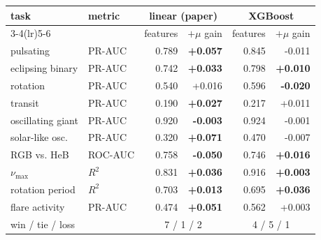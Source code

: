 \begin{tabular}{llrrrr}
\toprule
task & metric & \multicolumn{2}{c}{linear (paper)} & \multicolumn{2}{c}{XGBoost} \\
\cmidrule(lr){3-4}\cmidrule(lr){5-6}
 & & features & $+\mu$ gain & features & $+\mu$ gain \\
\midrule
pulsating & PR-AUC & 0.789 & \textbf{+0.057} & 0.845 & -0.011 \\
eclipsing binary & PR-AUC & 0.742 & \textbf{+0.033} & 0.798 & \textbf{+0.010} \\
rotation & PR-AUC & 0.540 & +0.016 & 0.596 & \textbf{-0.020} \\
transit & PR-AUC & 0.190 & \textbf{+0.027} & 0.217 & +0.011 \\
oscillating giant & PR-AUC & 0.920 & \textbf{-0.003} & 0.924 & -0.001 \\
solar-like osc. & PR-AUC & 0.320 & \textbf{+0.071} & 0.470 & -0.007 \\
RGB vs. HeB & ROC-AUC & 0.758 & \textbf{-0.050} & 0.746 & \textbf{+0.016} \\
$\nu_{\max}$ & $R^2$ & 0.831 & \textbf{+0.036} & 0.916 & \textbf{+0.003} \\
rotation period & $R^2$ & 0.703 & \textbf{+0.013} & 0.695 & \textbf{+0.036} \\
flare activity & PR-AUC & 0.474 & \textbf{+0.051} & 0.562 & +0.003 \\
\midrule
win / tie / loss & & \multicolumn{2}{c}{7 / 1 / 2} & \multicolumn{2}{c}{4 / 5 / 1} \\
\bottomrule
\end{tabular}
